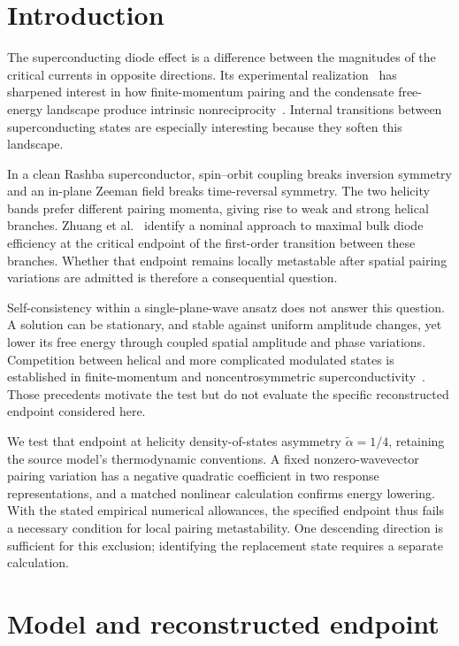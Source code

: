 \documentclass[11pt,a4paper]{article}
\begin{document}
\section{Introduction}
The superconducting diode effect is a difference between the magnitudes of the critical currents in opposite directions. Its experimental realization~\cite{Ando2020} has sharpened interest in how finite-momentum pairing and the condensate free-energy landscape produce intrinsic nonreciprocity~\cite{Daido2022,He2022}. Internal transitions between superconducting states are especially interesting because they soften this landscape.

In a clean Rashba superconductor, spin--orbit coupling breaks inversion symmetry and an in-plane Zeeman field breaks time-reversal symmetry. The two helicity bands prefer different pairing momenta, giving rise to weak and strong helical branches. Zhuang et al.~\cite{Zhuang2026} identify a nominal approach to maximal bulk diode efficiency at the critical endpoint of the first-order transition between these branches. Whether that endpoint remains locally metastable after spatial pairing variations are admitted is therefore a consequential question.

Self-consistency within a single-plane-wave ansatz does not answer this question. A solution can be stationary, and stable against uniform amplitude changes, yet lower its free energy through coupled spatial amplitude and phase variations. Competition between helical and more complicated modulated states is established in finite-momentum and noncentrosymmetric superconductivity~\cite{Fulde1964,Kaur2005,Agterberg2007,Dimitrova2007}. Those precedents motivate the test but do not evaluate the specific reconstructed endpoint considered here.

We test that endpoint at helicity density-of-states asymmetry $\widetilde\alpha=1/4$, retaining the source model's thermodynamic conventions. A fixed nonzero-wavevector pairing variation has a negative quadratic coefficient in two response representations, and a matched nonlinear calculation confirms energy lowering. With the stated empirical numerical allowances, the specified endpoint thus fails a necessary condition for local pairing metastability. One descending direction is sufficient for this exclusion; identifying the replacement state requires a separate calculation.

\section{Model and reconstructed endpoint}\label{sec:model}
\end{document}
